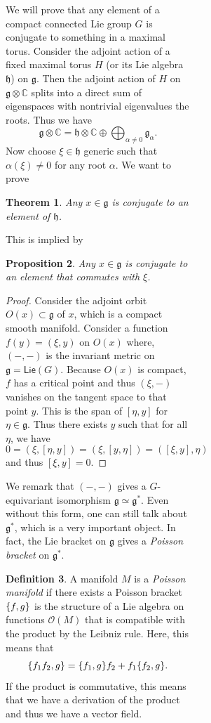 \documentclass[leqno, openany]{memoir}
\newtheorem{thm}{Theorem}[section]
\newtheorem{prop}[thm]{Proposition}
\theoremstyle{definition}
\newtheorem{defn}[thm]{Definition}
\theoremstyle{remark}
\theoremstyle{plain}
\theoremstyle{definition}
\theoremstyle{remark}
\newcommand{\C}{\mathbb{C}}
\newcommand{\mc}[1]{\mathcal{#1}}
\newcommand{\mf}[1]{\mathfrak{#1}}
\newcommand{\ms}[1]{\mathsf{#1}}
\begin{document}
\begin{figure}[H]
\begin{figure}[H]
\begin{figure}[H]
We will prove that any element of a compact connected Lie group $G$ is
conjugate to something in a maximal torus. Consider the adjoint action of a
fixed maximal torus $H$ (or its Lie algebra $\mf{h}$) on $\mf{g}$. Then the
adjoint action of $H$ on $\mf{g} \otimes \C$ splits into a direct sum of
eigenspaces with nontrivial eigenvalues the roots. Thus we have \[ \mf{g}
\otimes \C = \mf{h} \otimes \C \oplus \bigoplus_{\alpha \neq 0 }
\mf{g}_{\alpha}. \] Now choose $\xi \in \mf{h}$ generic such that $\alpha(\xi)
\neq 0$ for any root $\alpha$. We want to prove

\begin{thm} Any $x \in \mf{g}$ is conjugate to an element of $\mf{h}$.
\end{thm}

This is implied by

\begin{prop} Any $x \in \mf{g}$ is conjugate to an element that commutes with
$\xi$.  \end{prop}

\begin{proof} Consider the adjoint orbit $O(x) \subset \mf{g}$ of $x$, which is
    a compact smooth manifold. Consider a function $f(y) = (\xi, y)$ on $O(x)$
    where, $(-,-)$ is the invariant metric on $\mf{g} = \ms{Lie}(G)$. Because
    $O(x)$ is compact, $f$ has a critical point and thus $(\xi, -)$ vanishes on
    the tangent space to that point $y$. This is the span of $[\eta, y]$ for
    $\eta \in \mf{g}$. Thus there exists $y$ such that for all $\eta$, we have
    \[ 0 = (\xi, [\eta, y]) = (\xi, [y, \eta]) = ([\xi, y], \eta) \] and thus
$[\xi, y] = 0$.  \end{proof}

We remark that $(-,-)$ gives a $G$-equivariant isomorphism $\mf{g} \simeq
\mf{g}^*$. Even without this form, one can still talk about $\mf{g}^*$, which
is a very important object. In fact, the Lie bracket on $\mf{g}$ gives a
\textit{Poisson bracket} on $\mf{g}^*$.

\begin{defn} A manifold $M$ is a \textit{Poisson manifold} if there exists a
    Poisson bracket $\qty{f, g}$ is the structure of a Lie algebra on functions
    $\mc{O}(M)$ that is compatible with the product by the Leibniz rule. Here,
    this means that \[ \qty{f_1 f_2, g} = \qty{f_1, g} f_2 + f_1 \qty{f_2, g}.
    \] If the product is commutative, this means that we have a derivation of
the product and thus we have a vector field.  \end{defn}


\end{figure}
\end{figure}
\end{figure}
\end{document}
